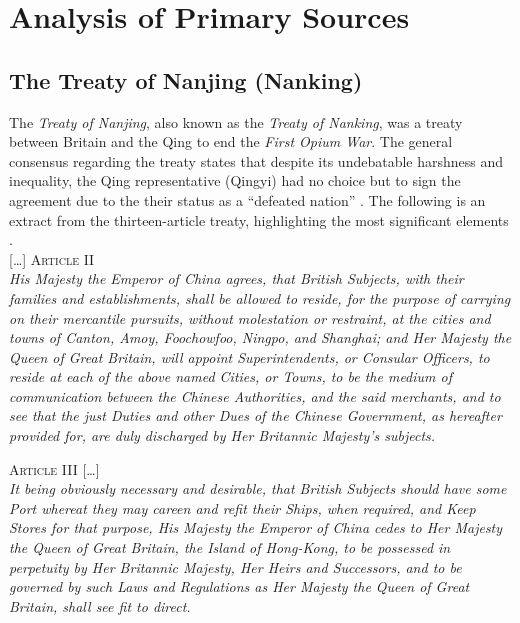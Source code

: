 \documentclass{article}
\newcommand{\textrule}{\noindent\makebox[\linewidth]{\rule{\linewidth}{0.4pt}}}
\begin{document}
\section{Analysis of Primary Sources}

\subsection{The Treaty of Nanjing (Nanking)}

The \textit{Treaty of Nanjing}, also known as the \textit{Treaty of Nanking}, was a treaty between Britain and the Qing to end the \textit{First Opium War}. The general consensus regarding the treaty states that despite its undebatable harshness and inequality, the Qing representative (Qingyi) had no choice but to sign the agreement due to the their status as a ``defeated nation''
\autocite{Mao:2018}. The following is an extract from the thirteen-article treaty, highlighting the most significant elements \autocite{Wright:2007}. \\

\textrule
\vspace{0.6em}
{\centering \textsc{[\ldots] Article II} \\[1em]}
\textit{His Majesty the Emperor of China agrees, that British Subjects, with their families and establishments, shall be allowed to reside, for the purpose of carrying on their mercantile pursuits, without molestation or restraint, at the cities and towns of Canton, Amoy, Foochowfoo, Ningpo, and Shanghai; and Her Majesty the Queen of Great Britain, will appoint Superintendents, or Consular Officers, to reside at each of the above named Cities, or Towns, to be the medium of communication between the Chinese Authorities, and the said merchants, and to see that the just Duties and other Dues of the Chinese Government, as hereafter provided for, are duly discharged by Her Britannic Majesty's subjects.}

{\centering \textsc{Article III [\ldots]} \\[1em]}
\textit{It being obviously necessary and desirable, that British Subjects should have some Port whereat they may careen and refit their Ships, when required, and Keep Stores for that purpose, His Majesty the Emperor of China cedes to Her Majesty the Queen of Great Britain, the Island of Hong-Kong, to be possessed in perpetuity by Her Britannic Majesty, Her Heirs and Successors, and to be governed by such Laws and Regulations as Her Majesty the Queen of Great Britain, shall see fit to direct.} \\
\end{document}
